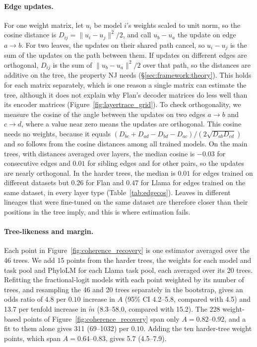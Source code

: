 \documentclass{article}
\theoremstyle{definition}
\theoremstyle{plain}
\newif\ifrevision
\newcommand{\revtag}[1]{\ifrevision\textsuperscript{\color{blue}\sffamily\scriptsize[#1]}\fi}
\begin{document}
{\paragraph{Edge updates.}\revtag{S8sV Q3} For one weight matrix, let $u_i$ be model $i$'s weights scaled to unit norm, so the cosine distance is $D_{ij}=\lVert u_i-u_j\rVert^2/2$, and call $u_b-u_a$ the update on edge $a\to b$. For two leaves, the updates on their shared path cancel, so $u_i-u_j$ is the sum of the updates on the path between them. If updates on different edges are orthogonal, $D_{ij}$ is the sum of $\lVert u_b-u_a\rVert^2/2$ over that path, so the distances are additive on the tree, the property NJ needs (\S\ref{sec:framework:theory}). This holds for each matrix separately, which is one reason a single matrix can estimate the tree, although it does not explain why Flan's decoder matrices do less well than its encoder matrices (Figure~\ref{fig:layertrace_grid}). To check orthogonality, we measure the cosine of the angle between the updates on two edges $a\to b$ and $c\to d$, where a value near zero means the updates are orthogonal. This cosine needs no weights, because it equals $(D_{bc}+D_{ad}-D_{bd}-D_{ac})/(2\sqrt{D_{ab}D_{cd}})$ and so follows from the cosine distances among all trained models. On the main trees, with distances averaged over layers, the median cosine is $-0.03$ for consecutive edges and $0.01$ for sibling edges and for other pairs, so the updates are nearly orthogonal. In the harder trees, the median is $0.01$ for edges trained on different datasets but $0.26$ for Flan and $0.47$ for Llama for edges trained on the same dataset, in every layer type (Table~\ref{tab:edgecos}). Leaves in different lineages that were fine-tuned on the same dataset are therefore closer than their positions in the tree imply, and this is where estimation fails.

\paragraph{Tree-likeness and margin.} Each point in Figure~\ref{fig:coherence_recovery} is one estimator averaged over the 46 trees. We add 15 points from the harder trees, the weights for each model and task pool and PhyloLM for each Llama task pool, each averaged over its 20 trees. Refitting the fractional-logit models with each point weighted by its number of trees, and resampling the 46 and 20 trees separately in the bootstrap, gives an odds ratio of 4.8 per $0.10$ increase in $A$ (95\% CI 4.2--5.8, compared with 4.5) and 13.7 per tenfold increase in $\widetilde m$ (8.3--58.0, compared with 15.2). The 228 weight-based points of Figure~\ref{fig:coherence_recovery} span only $A=0.82$--$0.92$, and a fit to them alone gives 311 (69--1032) per $0.10$. Adding the ten harder-tree weight points, which span $A=0.64$--$0.83$, gives 5.7 (4.5--7.9).

}
\end{document}
